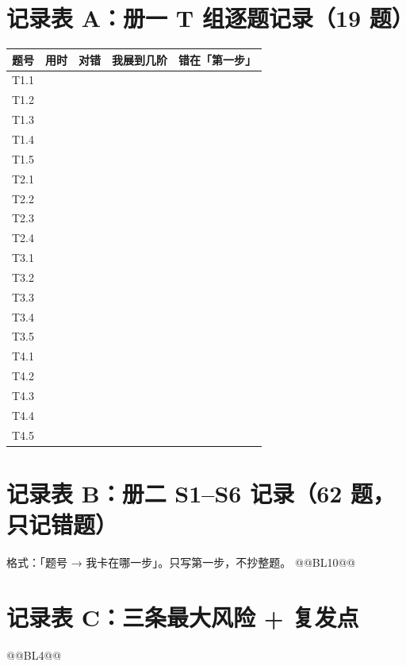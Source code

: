 \section{记录表 A：册一 T 组逐题记录（19 题）}
\small\setlength{\tabcolsep}{4pt}
\renewcommand{\arraystretch}{2.30}
\begin{tabularx}{\linewidth}{c|c|c|p{4.2cm}|X}
\toprule
题号 & 用时 & 对错 & 我展到几阶 & 错在「第一步」 \\
\midrule
T1.1 & & & & \\
T1.2 & & & & \\
T1.3 & & & & \\
T1.4 & & & & \\
T1.5 & & & & \\
T2.1 & & & & \\
T2.2 & & & & \\
T2.3 & & & & \\
T2.4 & & & & \\
T3.1 & & & & \\
T3.2 & & & & \\
T3.3 & & & & \\
T3.4 & & & & \\
T3.5 & & & & \\
T4.1 & & & & \\
T4.2 & & & & \\
T4.3 & & & & \\
T4.4 & & & & \\
T4.5 & & & & \\
\bottomrule
\end{tabularx}
\renewcommand{\arraystretch}{1.30}
\normalsize

\section{记录表 B：册二 S1--S6 记录（62 题，只记错题）}
{\small 格式：「题号 → 我卡在哪一步」。只写第一步，不抄整题。}
@@BL10@@
\section{记录表 C：三条最大风险 + 复发点}
@@BL4@@
